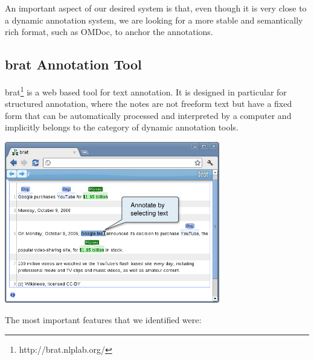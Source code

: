 \documentclass[a4paper, 12pt, notitlepage]{report}
\begin{document}
An important aspect of our desired system is that, even though it is very close to a dynamic annotation system, we are looking for a more stable and semantically rich format, such as OMDoc, to anchor the annotations.

\subsection{brat Annotation Tool} %
brat\footnote{http://brat.nlplab.org/} is a web based tool for text annotation. It is designed in particular for structured annotation, where the notes are not freeform text but have a fixed form that can
be automatically processed and interpreted by a computer and implicitly belongs to the category of dynamic annotation tools.
\begin{center}
 \includegraphics[width=3.7in]{brat.png}
\end{center}
The most important features that we identified were:
\end{document}
